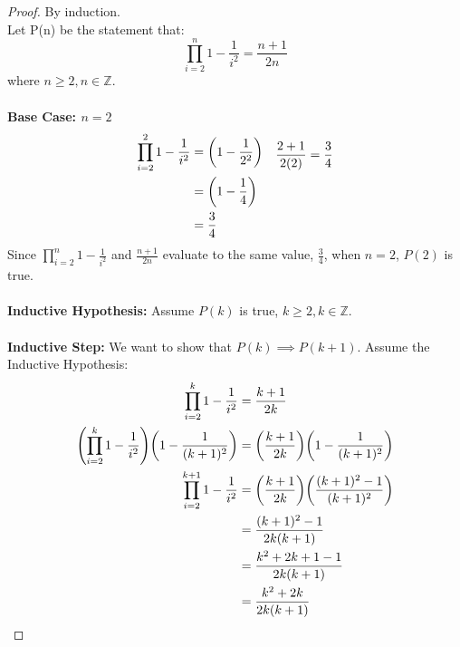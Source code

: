 \documentclass[article,12pt]{article}
\DeclarePairedDelimiter\paren{(}{)} %
\newcommand{\df}{\displaystyle\frac} %
\newcommand{\ints}{\mathbb{Z}}
\begin{document}
\begin{proof} By induction. \\
    Let P(n) be the statement that:
    \[ \prod_{i=2}^{n}{1 - \frac{1}{i^2}} = \frac{n+1}{2n}\]
    where $n \geq 2, n \in \ints$. \\
    \\
    \textbf{Base Case: $n=2$}
    \begin{align*}
        \begin{aligned}
            \prod_{i=2}^{2}{1-\frac{1}{i^2}} &= \paren*{1 - \frac{1}{2^2}} \\
                                         &= \paren*{1 - \frac{1}{4}} \\
                                         &= \frac{3}{4}
        \end{aligned}
        &&
        \begin{aligned}
            \frac{2+1}{2(2)} &= \frac{3}{4} \\
            \\
            \\
            \\
        \end{aligned}
    \end{align*}
    Since $\displaystyle\prod_{i=2}^{n}{1-\frac{1}{i^2}}$ and $\df{n+1}{2n}$ evaluate to the same value, $\df{3}{4}$, when $n=2$, $P(2)$ is true. \\
    \\
    \textbf{Inductive Hypothesis:} Assume $P(k)$ is true, $k \geq 2, k \in \ints$. \\
    \\
    \textbf{Inductive Step:} We want to show that $P(k) \implies P(k+1)$. Assume the Inductive Hypothesis:
    \begin{align*}
        \prod_{i=2}^{k}{1-\frac{1}{i^2}} &= \frac{k+1}{2k} \\
        \paren*{\prod_{i=2}^{k}{1-\frac{1}{i^2}}}\paren*{1-\frac{1}{(k+1)^2}} &= \paren*{\frac{k+1}{2k}}\paren*{1-\frac{1}{(k+1)^2}} \\
        \prod_{i=2}^{k+1}{1-\frac{1}{i^2}} &= \paren*{\frac{k+1}{2k}}\paren*{\frac{(k+1)^2 - 1}{(k+1)^2}} \\
                                           &= \frac{(k+1)^2 - 1}{2k(k+1)} \\
                                           &= \frac{k^2 + 2k + 1 - 1}{2k(k+1)} \\
                                           &= \frac{k^2 + 2k}{2k(k+1)} \\

\end{align*}
\end{proof}
\end{document}
